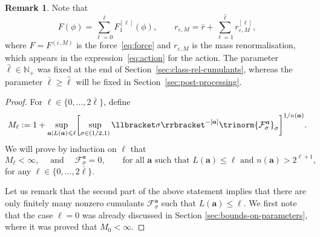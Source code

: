 \documentclass{article}
\numberwithin{equation}{section}
\newcommand{\assign}{:=}
\theoremstyle{plain}
\theoremstyle{definition}
\newtheorem{remark}[theorem]{Remark}
\begin{document}
\begin{remark}
  Note that
  \[ F  (\phi) = \sum_{\ell = 0}^{\bar{\ell}} F^{[\ell]}_1 (\phi), \qquad
     r_{\varepsilon, M} = \bar{r} + \sum_{\ell = 1}^{\hat{\ell}}
     r^{[\ell]}_{\varepsilon, M}, \]
  where $F = F^{(\varepsilon, M)}$ is the force~\eqref{eq:force} and $r
  _{\varepsilon, M}$ is the mass renormalisation, which appears in the
  expression~\eqref{eq:action} for the action. The parameter $\hat{\ell} \in
  \mathbb{N}_+$ was fixed at the end of Section~\ref{sec:class-rel-cumulants},
  whereas the parameter $\bar{\ell} \geqslant \hat{\ell}$ will be fixed in
  Section~\ref{sec:post-processing}.
\end{remark}

\begin{proof}
  For $\ell \in \{ 0, \ldots, 2 \bar{\ell} \}$, define
  \[ M_{\ell} \assign 1 + \sup_{\substack{
       \boldsymbol{a} \mid L (\boldsymbol{a}) \leqslant \ell
     }} \biggl[\sup_{\sigma \in (1 / 2, 1)} \llbracket \sigma
     \rrbracket^{- [\boldsymbol{a}]}  \trinorm{
     \mathcal{F}^{\boldsymbol{a}}_{\sigma} }_{\sigma}\biggr]^{1 / n
     (\boldsymbol{a})} . \]
  We will prove by induction on $\ell$ that
  \begin{equation}
    M_{\ell} < \infty, \quad \operatorname{and} \quad
    \mathcal{F}^{\boldsymbol{a}}_{\sigma} = 0, \qquad \text{for all
    $\boldsymbol{a}$ such that $L (\boldsymbol{a}) \leqslant \ell$ and $n
    (\boldsymbol{a}) > 2^{\ell + 1}$,} \label{eq:induction}
  \end{equation}
  for any $\ell \in \{ 0, \ldots, 2 \bar{\ell} \}$.
  
  Let us remark that the second part of the above statement implies that there
  are only finitely many nonzero cumulants
  $\mathcal{F}^{\boldsymbol{a}}_{\sigma}$ such that $L (\boldsymbol{a}) \leqslant
  \ell$. We first note that the case $\ell = 0$ was already discussed in Section
  \ref{sec:bounds-on-parameters}, where it was proved that $M_0 < \infty$.
  

\end{proof}
\end{document}
